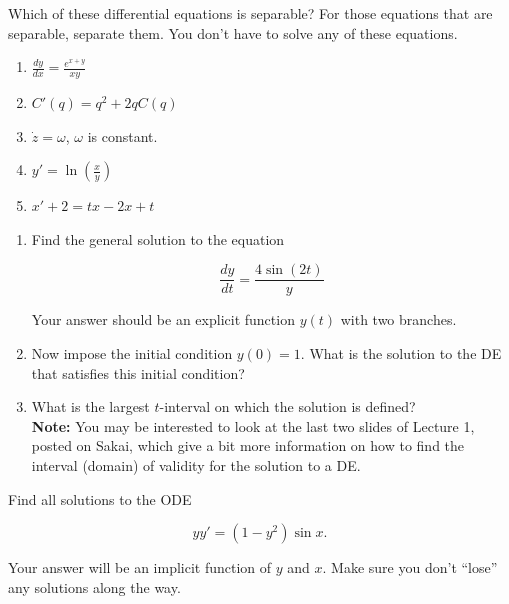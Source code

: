 \documentclass[12pt,letterpaper]{hmcpset}
\begin{document}

\begin{problem}[1]
Which of these differential equations is separable? For those equations that are separable,
separate them. You don’t have to solve any of these equations.
\begin{enumerate}
	\item $\displaystyle{\frac{dy}{dx} = \frac{e^{x+y}}{xy}}$
	\item $C'(q) = q^2+2qC(q)$
	\item $\dot{z} = \omega$, $\omega$ is constant.
	\item $\displaystyle{y' = \ln\left({\frac{x}{y}}\right)}$
	\item $x' + 2 = tx-2x+t$
\end{enumerate}
\end{problem}

\begin{solution}
  \vfill
\end{solution}
\newpage

\begin{problem}[2]
  \begin{enumerate}
  	\item Find the general solution to the equation 
  	
  	$$\frac{dy}{dt} = \frac{4 \sin(2t)}{y}$$
  	
  	Your answer should be an explicit function $y(t)$ with two branches. 
  	 
  	\item Now impose the initial condition $y(0)=1$.  What is the solution to the DE that satisfies this initial condition?  
  	
  	\item What is the largest $t$-interval on which the solution is defined?\\
  	\textbf{Note:} You may be interested to look at the last two slides of Lecture 1, posted on Sakai, which give a bit more information on how to find the interval (domain) of validity for the solution to a DE.
  	
  \end{enumerate}
\end{problem}

\begin{solution}
  \vfill
\end{solution}
\newpage

\begin{problem}[3]
  Find all solutions to the ODE
  
  $$yy' = (1-y^2)\sin x. $$
  
  Your answer will be an implicit function of $y$ and $x$.  Make sure you don't ``lose'' any solutions along the way.
\end{problem}
\end{document}
